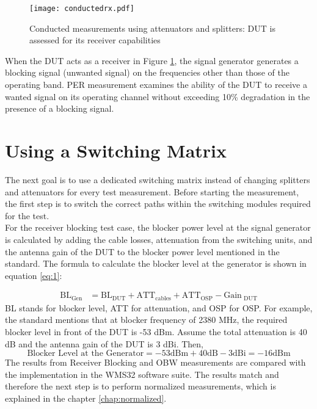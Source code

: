 \begin{figure}[H]
\centering
   \texttt{[image: conductedrx.pdf]}
 \vspace{-3.2cm} \caption{Conducted measurements using attenuators and splitters: \acs{DUT} is assessed for its receiver capabilities}
   \label{fig:Ng2}
\end{figure}

When the \acs{DUT} acts as a receiver in Figure \ref{fig:Ng2}, the signal generator generates a blocking signal (unwanted signal) on the frequencies other than those of the operating band.  \acf{PER} measurement examines the ability of the \acs{DUT} to receive a wanted signal on its operating channel without exceeding 10\% degradation in the presence of a blocking signal. 

\section{Using a Switching Matrix}
\label{sec:switch}
The next goal is to use a dedicated switching matrix instead of changing splitters and attenuators for every test measurement. Before starting the measurement, the first step is to switch the correct paths within the switching modules required for the test. \\

For the receiver blocking test case, the blocker power level at the signal generator is calculated by adding the cable losses, attenuation from the switching units, and the antenna gain of the \acs{DUT} to the blocker power level mentioned in the standard. The formula to calculate the blocker level at the generator is shown in equation \ref{eq:1}:

\begin{equation}
\begin{aligned}
\mbox{BL}_ {\mbox{Gen}}  &= \mbox{BL}_ {\mbox{DUT}} + \mbox{ATT}_{\mbox{cables}} 
+ \mbox{ATT}_{\mbox{OSP}}  - \mbox{Gain}_{\mbox{ DUT}}
\label{eq:1}
\end{aligned}
\end{equation}
BL stands for blocker level, ATT for attenuation, and OSP for \acf{OSP}. For example, the standard mentions that at blocker frequency of 2380 MHz, the required blocker level in front of the \acs{DUT} is -53 dBm. Assume the total attenuation is 40 dB and the antenna gain of the \acs{DUT} is 3 dBi. Then,
$$\mbox{Blocker Level at the Generator} = -53 \mbox{dBm} + 40 \mbox{dB}- 3 \mbox{dBi} = -16 \mbox{dBm}$$ 
The results from Receiver Blocking and \acf{OBW} measurements are compared with the implementation in the WMS32 software suite. The results match and therefore the next step is to perform normalized measurements, which is explained in the chapter \ref{chap:normalized}.






